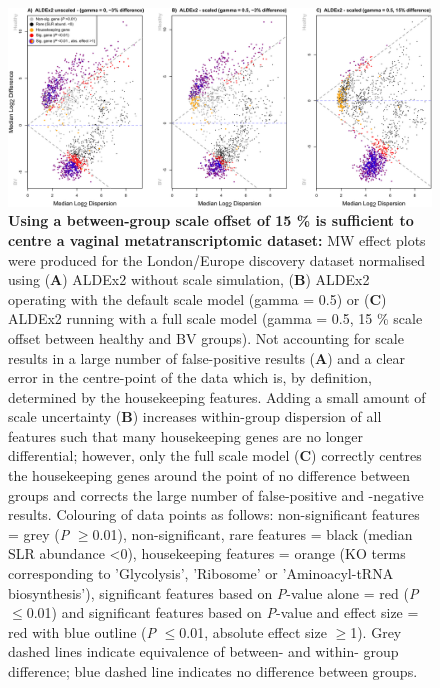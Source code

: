 \documentclass[sn-mathphys,Numbered]{sn-jnl}%
\begin{document}
\setcounter{figure}{0}
\renewcommand{\figurename}{Supplementary Fig.}
\renewcommand{\thefigure}{S\arabic{figure}}
\renewcommand{\theHfigure}{S\arabic{figure}}

\begin{figure}[H]
	\centering
	\includegraphics[scale = 0.88]{0_supplFig1.png}
	\caption{\textbf{Using a between-group scale offset of 15 \% is sufficient to centre a vaginal metatranscriptomic dataset:} MW effect plots were produced for the London/Europe discovery dataset normalised using (\textbf{A}) ALDEx2 without scale simulation, (\textbf{B}) ALDEx2 operating with the default scale model (gamma = 0.5) or (\textbf{C}) ALDEx2 running with a full scale model (gamma = 0.5, 15 \% scale offset between healthy and BV groups). Not accounting for scale results in a large number of false-positive results (\textbf{A}) and a clear error in the centre-point of the data which is, by definition, determined by the housekeeping features. Adding a small amount of scale uncertainty (\textbf{B}) increases within-group dispersion of all features such that many housekeeping genes are no longer differential; however, only the full scale model (\textbf{C}) correctly centres the housekeeping genes around the point of no difference between groups and corrects the large number of false-positive and -negative results. Colouring of data points as follows: non-significant features = grey (\textit{P} $\geq$0.01), non-significant, rare features = black (median SLR abundance <0), housekeeping features = orange (KO terms corresponding to 'Glycolysis', 'Ribosome' or 'Aminoacyl-tRNA biosynthesis'), significant features based on \textit{P}-value alone = red (\textit{P} $\leq$0.01) and significant features based on \textit{P}-value and effect size = red with blue outline (\textit{P} $\leq$0.01, absolute effect size $\geq$1). Grey dashed lines indicate equivalence of between- and within- group difference; blue dashed line indicates no difference between groups.} \label{fig:sfigScaleMWplots}
\end{figure}
\newpage
\end{document}
